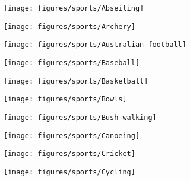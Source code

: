 \documentclass[11pt]{article}
\begin{document}
    

    \begin{figure}[htb!]
        \centering

        \begin{subfigure}{.5\textwidth}
            \centering
            \texttt{[image: figures/sports/Abseiling]}
        \end{subfigure}%
        \hfill
        \begin{subfigure}{.5\textwidth}
            \centering
            \texttt{[image: figures/sports/Archery]}
        \end{subfigure}%
        \hfill
        \begin{subfigure}{.5\textwidth}
            \centering
            \texttt{[image: figures/sports/Australian football]}
        \end{subfigure}%
        \hfill
        \begin{subfigure}{.5\textwidth}
            \centering
            \texttt{[image: figures/sports/Baseball]}
        \end{subfigure}%
        \hfill
        \begin{subfigure}{.5\textwidth}
            \centering
            \texttt{[image: figures/sports/Basketball]}
        \end{subfigure}%
        \hfill
        \begin{subfigure}{.5\textwidth}
            \centering
            \texttt{[image: figures/sports/Bowls]}
        \end{subfigure}%
        \hfill
        \begin{subfigure}{.5\textwidth}
            \centering
            \texttt{[image: figures/sports/Bush walking]}
        \end{subfigure}%
        \hfill
        \begin{subfigure}{.5\textwidth}
            \centering
            \texttt{[image: figures/sports/Canoeing]}
        \end{subfigure}%
        \hfill
        \begin{subfigure}{.5\textwidth}
            \centering
            \texttt{[image: figures/sports/Cricket]}
        \end{subfigure}%
        \hfill
        \begin{subfigure}{.5\textwidth}
            \centering
            \texttt{[image: figures/sports/Cycling]}
        \end{subfigure}%
    \end{figure}
\end{document}
